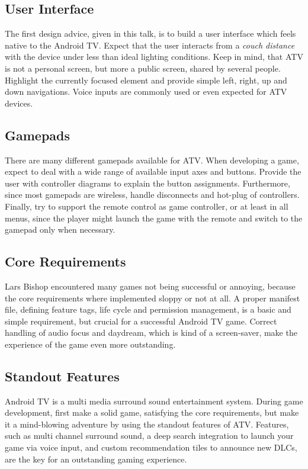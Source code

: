 \documentclass[a4paper]{article}
\begin{document}
\subsection{User Interface}
\label{lesson:ui}
The first design advice, given in this talk, is to build a user interface which feels native to the Android TV. Expect that the user interacts from a \emph{couch distance} with the device under less than ideal lighting conditions. Keep in mind, that ATV is not a personal screen, but more a public screen, shared by several people. Highlight the currently focused element and provide simple left, right, up and down navigations. Voice inputs are commonly used or even expected for ATV devices. 

\subsection{Gamepads}
There are many different gamepads available for ATV. When developing a game, expect to deal with a wide range of available input axes and buttons. Provide the user with controller diagrams to explain the button assignments. Furthermore, since most gamepads are wireless, handle disconnects and hot-plug of controllers. Finally, try to support the remote control as game controller, or at least in all menus, since the player might launch the game with the remote and switch to the gamepad only when necessary.

\subsection{Core Requirements}
Lars Bishop encountered many games not being successful or annoying, because the core requirements where implemented sloppy or not at all. A proper manifest file, defining feature tags, life cycle and permission management, is a basic and simple requirement, but crucial for a successful Android TV game. Correct handling of audio focus and daydream, which is kind of a screen-saver, make the experience of the game even more outstanding.

\subsection{Standout Features}
\label{lesson:standout-features}
Android TV is a multi media surround sound entertainment system. During game development, first make a solid game, satisfying the core requirements, but make it a mind-blowing adventure by using the standout features of ATV. Features, such as multi channel surround sound, a deep search integration to launch your game via voice input, and custom recommendation tiles to announce new DLCs, are the key for an outstanding gaming experience.
\end{document}
